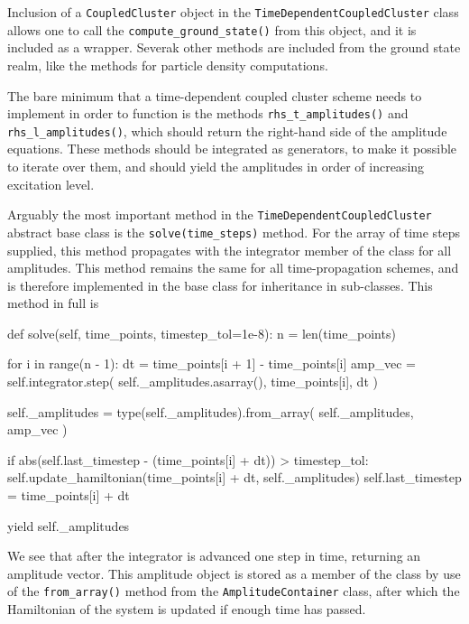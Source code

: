     Inclusion of a \lstinline{CoupledCluster} object in the 
    \lstinline{TimeDependentCoupledCluster} class allows one to call the 
    \lstinline{compute_ground_state()} from this object, and it is included as a 
    wrapper. Severak other methods are included from the ground state realm, like 
    the methods for particle density computations. 

    The bare minimum that a time-dependent coupled cluster scheme needs to implement 
    in order to function is the methods \lstinline{rhs_t_amplitudes()} and 
    \lstinline{rhs_l_amplitudes()}, which should return the right-hand side of 
    the amplitude equations. These methods should be integrated as generators, to make 
    it possible to iterate over them, and should yield the amplitudes in order of 
    increasing excitation level.

    

    Arguably the most important method in the \lstinline{TimeDependentCoupledCluster}
    abstract base class is the \lstinline{solve(time_steps)} method. For the array 
    of time steps supplied, this method propagates with the integrator member of the 
    class for all amplitudes. This method remains the same for all time-propagation 
    schemes, and is therefore implemented in the base class for inheritance in 
    sub-classes. This method in full is
    \begin{python}
    def solve(self, time_points, timestep_tol=1e-8):
        n = len(time_points)

        for i in range(n - 1):
            dt = time_points[i + 1] - time_points[i]
            amp_vec = self.integrator.step(
                self._amplitudes.asarray(), time_points[i], dt
            )

            self._amplitudes = type(self._amplitudes).from_array(
                self._amplitudes, amp_vec
            )

            if abs(self.last_timestep - (time_points[i] + dt)) > timestep_tol:
                self.update_hamiltonian(time_points[i] + dt, self._amplitudes)
                self.last_timestep = time_points[i] + dt

            yield self._amplitudes
    \end{python}
    We see that after the integrator is advanced one step in time, returning an amplitude 
    vector. This amplitude object is stored as a member of the class by use of the 
    \lstinline{from_array()} method from the \lstinline{AmplitudeContainer} class,
    after which the  
    Hamiltonian of the system is updated if enough time has passed.

